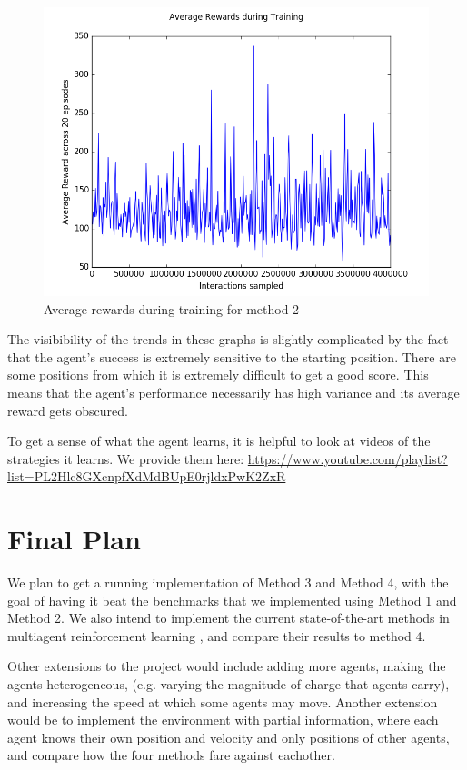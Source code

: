 \documentclass{article}
\begin{document}
\begin{figure}[H]
\centering
\includegraphics[scale=0.5]{dqn-multi-average-reward}
\caption{Average rewards during training for method 2}
\end{figure}

The visibibility of the trends in these graphs is slightly complicated by the
fact that the agent's success is extremely sensitive to the starting position.
There are some positions from which it is extremely difficult to get a good
score. This means that the agent's performance necessarily has high variance and
its average reward gets obscured.

To get a sense of what the agent learns, it is helpful to look at videos of the
strategies it learns. We provide them here:
\url{https://www.youtube.com/playlist?list=PL2Hlc8GXcnpfXdMdBUpE0rjldxPwK2ZxR}

\section{Final Plan}
We plan to get a running implementation of Method 3 and Method 4, with the goal
of having it beat the benchmarks that we implemented using Method 1 and Method 2.
We also intend to implement the current state-of-the-art methods
in multiagent reinforcement learning \cite{foerster2016learning, sukhbaatar2016learning, peng2017multiagent},
and compare their results to method 4.

Other extensions to the project would include adding more agents, making the agents heterogeneous,
(e.g. varying the magnitude of charge that agents carry), and increasing the speed at which
some agents may move. Another extension would be to implement the environment with partial
information, where each agent knows their own position and velocity and only positions of other
agents, and compare how the four methods fare against eachother.
\end{document}
